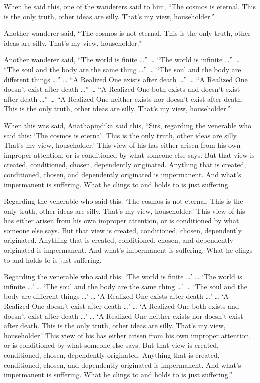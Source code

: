 \documentclass[12pt,openany]{book}%
\begin{document}
When he said this, one of the wanderers said to him, “The cosmos is eternal. This is the only truth, other ideas are silly. That’s my view, householder.” 

Another wanderer said, “The cosmos is not eternal. This is the only truth, other ideas are silly. That’s my view, householder.” 

Another wanderer said, “The world is finite …” … “The world is infinite …” … “The soul and the body are the same thing …” … “The soul and the body are different things …” … “A Realized One exists after death …” … “A Realized One doesn’t exist after death …” … “A Realized One both exists and doesn’t exist after death …” … “A Realized One neither exists nor doesn’t exist after death. This is the only truth, other ideas are silly. That’s my view, householder.” 

When this was said, \textsanskrit{Anāthapiṇḍika} said this, “Sirs, regarding the venerable who said this: ‘The cosmos is eternal. This is the only truth, other ideas are silly. That’s my view, householder.’ This view of his has either arisen from his own improper attention, or is conditioned by what someone else says. But that view is created, conditioned, chosen, dependently originated. Anything that is created, conditioned, chosen, and dependently originated is impermanent. And what’s impermanent is suffering. What he clings to and holds to is just suffering. 

Regarding the venerable who said this: ‘The cosmos is not eternal. This is the only truth, other ideas are silly. That’s my view, householder.’ This view of his has either arisen from his own improper attention, or is conditioned by what someone else says. But that view is created, conditioned, chosen, dependently originated. Anything that is created, conditioned, chosen, and dependently originated is impermanent. And what’s impermanent is suffering. What he clings to and holds to is just suffering. 

Regarding the venerable who said this: ‘The world is finite …’ … ‘The world is infinite …’ … ‘The soul and the body are the same thing …’ … ‘The soul and the body are different things …’ … ‘A Realized One exists after death …’ … ‘A Realized One doesn’t exist after death …’ … ‘A Realized One both exists and doesn’t exist after death …’ … ‘A Realized One neither exists nor doesn’t exist after death. This is the only truth, other ideas are silly. That’s my view, householder.’ This view of his has either arisen from his own improper attention, or is conditioned by what someone else says. But that view is created, conditioned, chosen, dependently originated. Anything that is created, conditioned, chosen, and dependently originated is impermanent. And what’s impermanent is suffering. What he clings to and holds to is just suffering.” 
\end{document}
